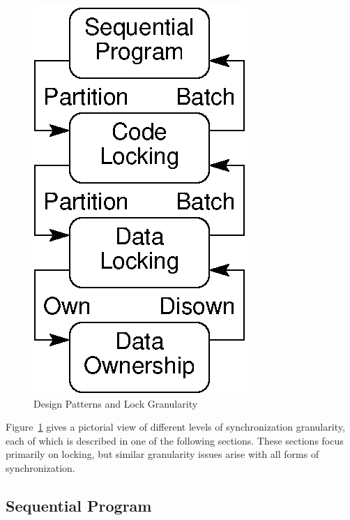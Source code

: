 \begin{figure}[tb]
\begin{center}
\includegraphics{SMPdesign/LockGranularity}
\end{center}
\caption{Design Patterns and Lock Granularity}
\label{fig:SMPdesign:Design Patterns and Lock Granularity}
\end{figure}

Figure~\ref{fig:SMPdesign:Design Patterns and Lock Granularity}
gives a pictorial view of different levels of synchronization granularity,
each of which is described in one of the following sections.
These sections focus primarily on locking, but similar granularity
issues arise with all forms of synchronization.

\subsection{Sequential Program}
\label{sec:SMPdesign:Sequential Program}


